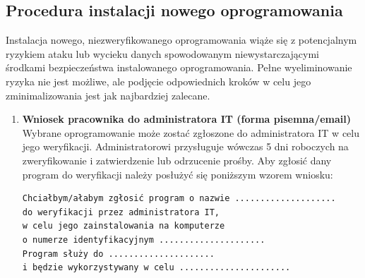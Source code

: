 \documentclass[12pt,a4paper]{article}
\providecommand{\tightlist}{\setlength{\itemsep}{0pt}\setlength{\parskip}{0pt}}
\begin{document}
\subsection{Procedura instalacji nowego
oprogramowania}\label{procedura-instalacji-nowego-oprogramowania}
Instalacja nowego, niezweryfikowanego oprogramowania wiąże się z potencjalnym ryzykiem ataku lub wycieku danych spowodowanym niewystarczającymi środkami bezpieczeństwa instalowanego oprogramowania. Pełne wyeliminowanie ryzyka nie jest możliwe, ale podjęcie odpowiednich kroków w celu jego zminimalizowania jest jak najbardziej zalecane.
\begin{enumerate}
\tightlist
\item
  \textbf{Wniosek pracownika do administratora IT (forma pisemna/email)}
  Wybrane oprogramowanie może zostać zgłoszone do administratora IT w celu jego weryfikacji. Administratorowi przysługuje wówczas 5 dni roboczych na zweryfikowanie i zatwierdzenie lub odrzucenie prośby. Aby zgłosić dany program do weryfikacji należy posłużyć się poniższym wzorem wniosku:

\begin{verbatim}
Chciałbym/ałabym zgłosić program o nazwie .................... 
do weryfikacji przez administratora IT,
w celu jego zainstalowania na komputerze 
o numerze identyfikacyjnym ..................... 
Program służy do .....................
i będzie wykorzystywany w celu ......................
\end{verbatim}


\end{enumerate}
\end{document}
